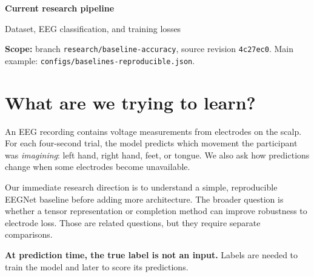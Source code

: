 \documentclass[11pt,a4paper]{article}
\newcommand{\code}[1]{{\small\nolinkurl{#1}}}
\begin{document}
{\LARGE\bfseries\color{navy} Current research pipeline}\par
{\large Dataset, EEG classification, and training losses}\par
\textbf{Scope:} branch \code{research/baseline-accuracy}, source revision
\code{4c27ec0}. Main example: \code{configs/baselines-reproducible.json}.

\section{What are we trying to learn?}
An EEG recording contains voltage measurements from electrodes on the scalp.
For each four-second trial, the model predicts which movement the participant
was \emph{imagining}: left hand, right hand, feet, or tongue. We also ask how
predictions change when some electrodes become unavailable.

Our immediate research direction is to understand a simple, reproducible
EEGNet baseline before adding more architecture. The broader question is whether
a tensor representation or completion method can improve robustness to electrode
loss. Those are related questions, but they require separate comparisons.

\begin{center}
\end{center}
\textbf{At prediction time, the true label is not an input.} Labels are needed
to train the model and later to score its predictions.
\end{document}
